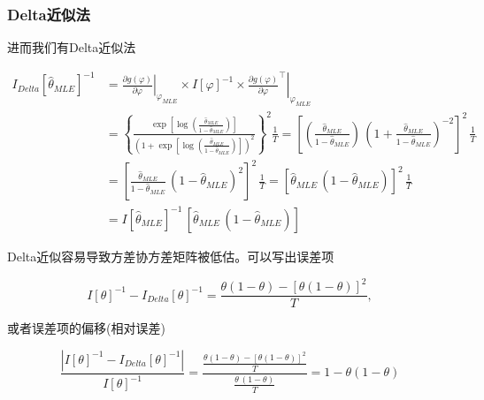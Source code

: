 \subsubsection{Delta近似法}
\label{deltaux8fd1ux4f3cux6cd5}
进而我们有Delta近似法

\begin{equation}
  \begin{split}
    I_{Delta}[\widehat{\theta}_{MLE}]^{-1}
& = \left. \frac{\partial g(\varphi)}{\partial \varphi} \right|_{\varphi_{MLE}}
\times I[\varphi]^{-1} \times
\left. \frac{\partial g(\varphi)}{\partial \varphi}^{\top} \right|_{\varphi_{MLE}} \\
& = \left\{
\frac{
\exp \left[ \log \left( \frac{\widehat{\theta}_{MLE}}{1 - \widehat{\theta}_{MLE}} \right) \right]
}{
\left(
1 + \exp \left[ \log \left( \frac{\widehat{\theta}_{MLE}}{1 - \widehat{\theta}_{MLE}} \right) \right]
\right)^{2}
}
\right\}^{2} \frac{1}{T}
 = \left[
\left( \frac{\widehat{\theta}_{MLE}}{1 - \widehat{\theta}_{MLE}} \right)
\,
\left( 1 + \frac{\widehat{\theta}_{MLE}}{1 - \widehat{\theta}_{MLE}} \right)^{-2}
\right]^{2} \, \frac{1}{T} \\
& = \left[
\frac{\widehat{\theta}_{MLE}}{1 - \widehat{\theta}_{MLE}}
\,
\left(1 - \widehat{\theta}_{MLE} \right)^{2}
\right]^{2} \, \frac{1}{T}
= \left[ \widehat{\theta}_{MLE} \, \left( 1 - \widehat{\theta}_{MLE} \right) \right]^{2} \, \frac{1}{T} \\
& = I \left[ \widehat{\theta}_{MLE} \right]^{-1} \,
\left[
\widehat{\theta}_{MLE} \, \left( 1 - \widehat{\theta}_{MLE} \right)
\right]
  \end{split}
\end{equation}

Delta近似容易导致方差协方差矩阵被低估。可以写出误差项

\begin{equation}
I \left[ \theta \right]^{-1} - I_{Delta} \left[ \theta \right]^{-1} =
\frac{\theta \left( 1 - \theta \right) - \left[ \theta \left( 1 - \theta \right) \right]^{2}}{T},
\end{equation}

或者误差项的偏移(相对误差)

\begin{equation}
\frac{
\left| I \left[ \theta \right]^{-1} - I_{Delta} \left[ \theta \right]^{-1} \right|
}{
I \left[ \theta \right]^{-1}
} =
\frac{
\frac{\theta \left( 1 - \theta \right) - \left[ \theta \left( 1 - \theta \right) \right]^{2}}{T}
}{
\frac{\theta \, \left( 1 - \theta \right)}{T}
} = 1 - \theta \left( 1 - \theta \right)
\end{equation}

